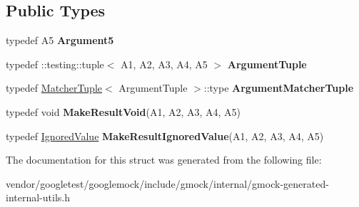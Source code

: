 \subsection*{Public Types}
\begin{DoxyCompactItemize}
\item 
\mbox{\label{structtesting_1_1internal_1_1_function_3_01_r_07_a1_00_01_a2_00_01_a3_00_01_a4_00_01_a5_08_4_a5bc0279c43aa98c409219dee1b815c71}} 
typedef A5 {\bfseries Argument5}
\item 
\mbox{\label{structtesting_1_1internal_1_1_function_3_01_r_07_a1_00_01_a2_00_01_a3_00_01_a4_00_01_a5_08_4_af5a1487829347eae2a48b2f66f216f52}} 
typedef \+::testing\+::tuple$<$ A1, A2, A3, A4, A5 $>$ {\bfseries Argument\+Tuple}
\item 
\mbox{\label{structtesting_1_1internal_1_1_function_3_01_r_07_a1_00_01_a2_00_01_a3_00_01_a4_00_01_a5_08_4_a03c18380538e53141227afe6d0f20cc8}} 
typedef \mbox{\hyperlink{structtesting_1_1internal_1_1_matcher_tuple}{Matcher\+Tuple}}$<$ Argument\+Tuple $>$\+::type {\bfseries Argument\+Matcher\+Tuple}
\item 
\mbox{\label{structtesting_1_1internal_1_1_function_3_01_r_07_a1_00_01_a2_00_01_a3_00_01_a4_00_01_a5_08_4_a2903acde18de33d756eef4d43d843c04}} 
typedef void {\bfseries Make\+Result\+Void}(A1, A2, A3, A4, A5)
\item 
\mbox{\label{structtesting_1_1internal_1_1_function_3_01_r_07_a1_00_01_a2_00_01_a3_00_01_a4_00_01_a5_08_4_a552ce4ec27e2d09fa1c133c66f72d7b3}} 
typedef \mbox{\hyperlink{classtesting_1_1internal_1_1_ignored_value}{Ignored\+Value}} {\bfseries Make\+Result\+Ignored\+Value}(A1, A2, A3, A4, A5)
\end{DoxyCompactItemize}


The documentation for this struct was generated from the following file\+:\begin{DoxyCompactItemize}
\item 
vendor/googletest/googlemock/include/gmock/internal/gmock-\/generated-\/internal-\/utils.\+h\end{DoxyCompactItemize}
